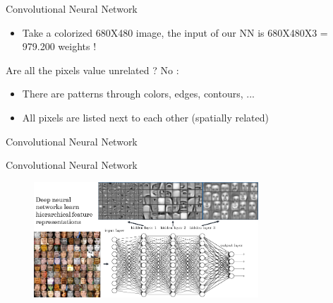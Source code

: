\documentclass[tikz,table,border=2mm]{beamer}
\begin{document}
\begin{frame}{Convolutional Neural Network}
\begin{itemize}
  \item Take a colorized 680X480 image, the input of our NN is 680X480X3 = 979.200 weights !
\end{itemize}
\begin{block}{Are all the pixels value unrelated ?}
	No :
\begin{itemize}
  \item There are patterns through colors, edges, contours, ...
  \item All pixels are listed next to each other (spatially related)
\end{itemize}
\end{block}
\end{frame}
\begin{frame}{Convolutional Neural Network}
\begin{center}
\end{center}
\end{frame}
\begin{frame}{Convolutional Neural Network}
\begin{figure}[ht]
    \centering
    \includegraphics[width=0.75\textwidth]{images/hier_feature.png}
\end{figure}
\end{frame}
\end{document}
